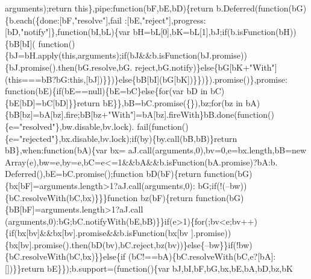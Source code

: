 \begin{DoxyCode}
      arguments);\textcolor{keywordflow}{return} \textcolor{keyword}{this}\},pipe:\textcolor{keyword}{function}(bF,bE,bD)\{\textcolor{keywordflow}{return} b.Deferred(\textcolor{keyword}{function}(bG)\{b.each(\{done:[bF,\textcolor{stringliteral}{"resolve"}],fail
      :[bE,\textcolor{stringliteral}{"reject"}],progress:[bD,\textcolor{stringliteral}{"notify"}]\},\textcolor{keyword}{function}(bI,bL)\{var bH=bL[0],bK=bL[1],bJ;\textcolor{keywordflow}{if}(b.isFunction(bH))\{bB[bI](\textcolor{keyword}{
      function}()\{bJ=bH.apply(\textcolor{keyword}{this},arguments);\textcolor{keywordflow}{if}(bJ&&b.isFunction(bJ.promise))\{bJ.promise().then(bG.resolve,bG.
      reject,bG.notify)\}\textcolor{keywordflow}{else}\{bG[bK+\textcolor{stringliteral}{"With"}](\textcolor{keyword}{this}===bB?bG:\textcolor{keyword}{this},[bJ])\}\})\}\textcolor{keywordflow}{else}\{bB[bI](bG[bK])\}\})\}).promise()\},promise:\textcolor{keyword}{
      function}(bE)\{\textcolor{keywordflow}{if}(bE==null)\{bE=bC\}\textcolor{keywordflow}{else}\{\textcolor{keywordflow}{for}(var bD in bC)\{bE[bD]=bC[bD]\}\}\textcolor{keywordflow}{return} bE\}\},bB=bC.promise(\{\}),bz;\textcolor{keywordflow}{for}(bz in
       bA)\{bB[bz]=bA[bz].fire;bB[bz+\textcolor{stringliteral}{"With"}]=bA[bz].fireWith\}bB.done(\textcolor{keyword}{function}()\{e=\textcolor{stringliteral}{"resolved"}\},bw.disable,bv.lock).
      fail(\textcolor{keyword}{function}()\{e=\textcolor{stringliteral}{"rejected"}\},bx.disable,bv.lock);\textcolor{keywordflow}{if}(by)\{by.call(bB,bB)\}\textcolor{keywordflow}{return} bB\},when:\textcolor{keyword}{function}(bA)\{var bx=
      aJ.call(arguments,0),bv=0,e=bx.length,bB=\textcolor{keyword}{new} Array(e),bw=e,by=e,bC=e<=1&&bA&&b.isFunction(bA.promise)?bA:b.
      Deferred(),bE=bC.promise();\textcolor{keyword}{function} bD(bF)\{\textcolor{keywordflow}{return} \textcolor{keyword}{function}(bG)\{bx[bF]=arguments.length>1?aJ.call(arguments,0):
      bG;\textcolor{keywordflow}{if}(!(--bw))\{bC.resolveWith(bC,bx)\}\}\}\textcolor{keyword}{function} bz(bF)\{\textcolor{keywordflow}{return} \textcolor{keyword}{function}(bG)\{bB[bF]=arguments.length>1?aJ.call
      (arguments,0):bG;bC.notifyWith(bE,bB)\}\}\textcolor{keywordflow}{if}(e>1)\{\textcolor{keywordflow}{for}(;bv<e;bv++)\{\textcolor{keywordflow}{if}(bx[bv]&&bx[bv].promise&&b.isFunction(bx[bv
      ].promise))\{bx[bv].promise().then(bD(bv),bC.reject,bz(bv))\}\textcolor{keywordflow}{else}\{--bw\}\}\textcolor{keywordflow}{if}(!bw)\{bC.resolveWith(bC,bx)\}\}\textcolor{keywordflow}{else}\{\textcolor{keywordflow}{if}
      (bC!==bA)\{bC.resolveWith(bC,e?[bA]:[])\}\}\textcolor{keywordflow}{return} bE\}\});b.support=(\textcolor{keyword}{function}()\{var bJ,bI,bF,bG,bx,bE,bA,bD,bz,bK

\end{DoxyCode}
